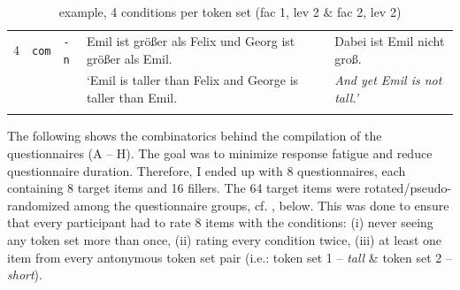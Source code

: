 \documentclass[output=paper]{langsci/langscibook}
\begin{document}
\begin{table}
\begin{tabular}{lllll}
\midrule
4 & \texttt{com} & \texttt{-n} & Emil ist größer als Felix \hspace{0.65pt} und Georg ist \hspace{16pt} größer als Emil. & Dabei ist Emil nicht groß.   \\
 & & & {`Emil is taller than Felix \hspace{2pt} and George is \hspace{19pt} taller than Emil.} & \textit{And yet Emil is not tall.'}   \\
\lspbottomrule
\end{tabular}
\caption{example, 4 conditions  per token set (fac 1, lev 2 \& fac 2, lev 2)}
\label{tab:emil_example}
\end{table}


\noindent The following shows the combinatorics behind the compilation of the questionnaires (A -- H). The goal was to minimize response fatigue and reduce questionnaire duration. Therefore, I ended up with 8 questionnaires, each containing 8 target items and 16 fillers. The 64 target items were rotated/pseudo-randomized among the questionnaire groups, cf. , below. This was done to ensure that every participant had to rate 8 items with the conditions: (i) never seeing any token set more than once, (ii) rating every condition twice, (iii) at least one item from every antonymous token set pair (i.e.: token set 1 -- \textit{tall} \& token set 2 -- \textit{short}).
\end{document}
